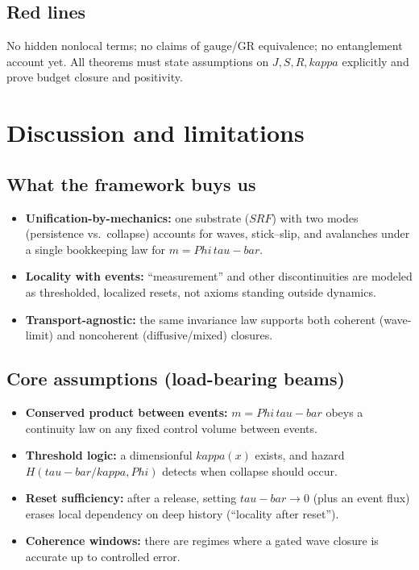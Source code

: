 \documentclass[12pt]{article}
\newcommand{\FoldDensity}{\Phi}
\newcommand{\FoldTime}{\bar{\tau}}
\newcommand{\Threshold}{\kappa}
\newcommand{\Survival}{S}
\newcommand{\Release}{R}
\newcommand{\SRF}{\mathcal{F}_{\mathrm{SR}}}
\def\FoldDensity{Phi}%
\def\FoldTime{tau-bar}%
\def\Threshold{kappa}%
\def\SRF{SRF}%
\def\Survival{S}%
\def\Release{R}%
\def\bar#1{#1}%
\def\mathcal#1{#1}%
\def\mathrm#1{#1}%
\begin{document}
\subsection{Red lines}
No hidden nonlocal terms; no claims of gauge/GR equivalence; no entanglement account yet. All theorems must state assumptions on $J,\Survival,\Release,\Threshold$ explicitly and prove budget closure and positivity.



\section{Discussion and limitations}

\subsection{What the framework buys us}
\begin{itemize}
  \item \textbf{Unification-by-mechanics:} one substrate ($\SRF$) with two modes (persistence vs.\ collapse) accounts for waves, stick--slip, and avalanches under a single bookkeeping law for $m=\FoldDensity\,\FoldTime$.
  \item \textbf{Locality with events:} ``measurement'' and other discontinuities are modeled as thresholded, localized resets, not axioms standing outside dynamics.
  \item \textbf{Transport-agnostic:} the same invariance law supports both coherent (wave-limit) and noncoherent (diffusive/mixed) closures.
\end{itemize}

\subsection{Core assumptions (load-bearing beams)}
\begin{itemize}
  \item \textbf{Conserved product between events:} $m=\FoldDensity\,\FoldTime$ obeys a continuity law on any fixed control volume between events.
  \item \textbf{Threshold logic:} a dimensionful $\Threshold(x)$ exists, and hazard $H(\FoldTime/\Threshold,\FoldDensity)$ detects when collapse should occur.
  \item \textbf{Reset sufficiency:} after a release, setting $\FoldTime\to 0$ (plus an event flux) erases local dependency on deep history (``locality after reset'').
  \item \textbf{Coherence windows:} there are regimes where a gated wave closure is accurate up to controlled error.
\end{itemize}
\end{document}
